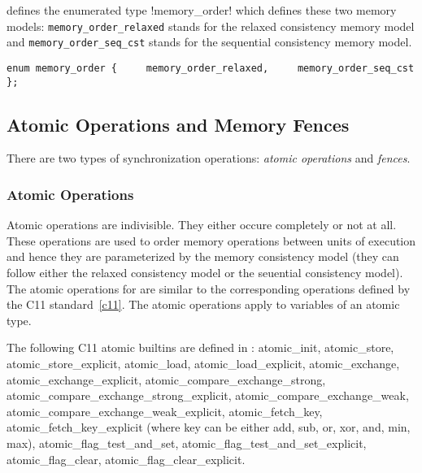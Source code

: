 \pencil defines the enumerated type \lstlisting!memory_order!
which defines these two memory models:
\lstinline!memory_order_relaxed! stands for the relaxed consistency memory
model and \lstinline!memory_order_seq_cst! stands for the sequential
consistency memory model.

\lstinline!enum memory_order {
    memory_order_relaxed,
    memory_order_seq_cst
};!

\subsection{Atomic Operations and Memory Fences}

There are two types of synchronization operations: \emph{atomic operations} and
\emph{fences}.

\subsubsection{Atomic Operations}
Atomic operations are indivisible. They either occure completely or not at all.
These operations are used to order memory operations between units of execution
and hence they are parameterized by the \pencil memory consistency model
(they can follow either the relaxed consistency model or the seuential
consistency model).
The atomic operations for \pencil are similar to the corresponding operations
defined by the C11 standard~\ref{c11}.
The \pencil atomic operations apply to variables of an atomic type.

The following C11 atomic builtins are defined in \pencil:
atomic_init, atomic_store, atomic_store_explicit, atomic_load,
atomic_load_explicit, atomic_exchange, 	atomic_exchange_explicit,
atomic_compare_exchange_strong, atomic_compare_exchange_strong_explicit,
atomic_compare_exchange_weak, atomic_compare_exchange_weak_explicit,
atomic_fetch_key, atomic_fetch_key_explicit (where key can be either
add, sub, or, xor, and, min, max),
atomic_flag_test_and_set, atomic_flag_test_and_set_explicit,
atomic_flag_clear, atomic_flag_clear_explicit.

